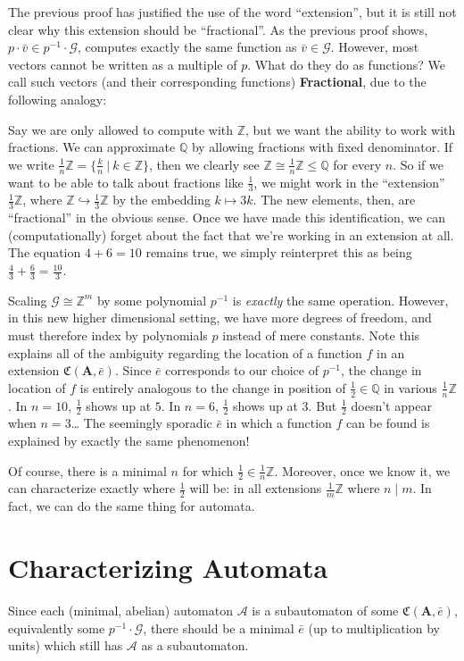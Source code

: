 \documentclass[final]{ws-ijac}
\newcommand{\A}{\mathcal{A}}
\newcommand{\G}{\mathcal{G}}
\newcommand{\C}{\mathfrak{C}(\Am,\e)}
\newcommand{\Z}{\mathbb{Z}}
\newcommand{\Q}{\mathbb{Q}}
\newcommand{\2}{\textbf{2}}
\newcommand{\Am}{\textbf{A}}
\newcommand{\vv}{\bar{v}}
\newcommand{\e}{\bar{e}}
\begin{document}
The previous proof has justified the use of the word ``extension'', 
but it is still not clear why this extension should be ``fractional''.
As the previous proof shows, $p \cdot \vv \in p^{-1} \cdot \G$, 
computes exactly the same function as $\vv \in \G$.
However, most vectors cannot be written as a multiple of $p$.
What do they do as functions?
We call such vectors (and their corresponding functions)
\textbf{Fractional}, due to the following analogy:

Say we are only allowed to compute with $\Z$, but we want the ability
to work with fractions. We can approximate $\Q$ by allowing fractions
with fixed denominator. If we write 
$\frac{1}{n} \mathbb{Z} = \{ \frac{k}{n} ~|~ k \in \Z \}$, 
then we clearly see $\Z \cong \frac{1}{n} \Z \leq \Q$ for every $n$. 
So if we want to be able to talk about fractions like 
$\frac{1}{3}$, we might work in the ``extension'' $\frac{1}{3} \Z$, where 
$\Z \hookrightarrow \frac{1}{3}\Z$ by the embedding $k \mapsto 3k$.
The new elements, then, are ``fractional'' in the obvious sense. 
Once we have made this identification, we can (computationally) forget
about the fact that we're working in an extension at all. The equation
$4 + 6 = 10$ remains true, we simply reinterpret this as being 
$\frac{4}{3} + \frac{6}{3} = \frac{10}{3}$. 

Scaling $\G \cong \Z^m$ by some polynomial $p^{-1}$ is \emph{exactly} the
same operation. However, in this new higher dimensional setting, we have 
more degrees of freedom, and must therefore index by polynomials $p$ instead
of mere constants. Note this explains all of the ambiguity regarding the
location of a function $f$ in an extension $\C$. Since $\e$ corresponds to
our choice of $p^{-1}$, the change in location of $f$ is entirely analogous
to the change in position of $\frac{1}{2} \in \Q$ in various $\frac{1}{n}\Z$.
In $n=10$, $\frac{1}{2}$ shows up at $5$. In $n=6$, $\frac{1}{2}$ shows up 
at $3$. But $\frac{1}{2}$ doesn't appear when $n=3$\ldots 
The seemingly sporadic $\e$ in which a function $f$ can be found is explained
by exactly the same phenomenon!

Of course, there is a minimal $n$ for which $\frac{1}{2} \in \frac{1}{n}\Z$.
Moreover, once we know it, we can characterize exactly where $\frac{1}{2}$
will be: in all extensions $\frac{1}{m}\Z$ where $n \mid m$. In fact, we can
do the same thing for automata.

\section{Characterizing Automata}
Since each (minimal, abelian) automaton $\A$ is a subautomaton of some $\C$,
equivalently some $p^{-1} \cdot \G$, there should be a minimal $\e$ 
(up to multiplication by units) which still has $\A$ as a subautomaton. 
\end{document}
